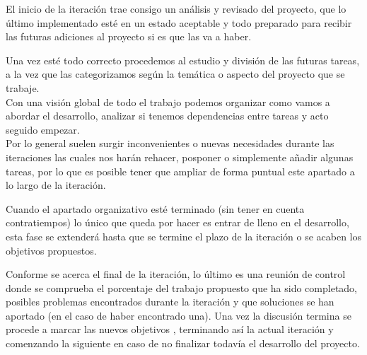El inicio de la iteración trae consigo un análisis y revisado del proyecto, que lo último
implementado esté en un estado aceptable y todo preparado para recibir las futuras adiciones
al proyecto si es que las va a haber.

Una vez esté todo correcto procedemos al estudio y división de las futuras tareas, a la vez 
que las categorizamos según la temática o aspecto del proyecto que se trabaje. \\
Con una visión global de todo el trabajo podemos organizar como vamos a
abordar el desarrollo, analizar si tenemos dependencias entre tareas y acto seguido empezar. \\
Por lo general suelen surgir inconvenientes o nuevas necesidades durante las iteraciones las
cuales nos harán rehacer, posponer o simplemente añadir algunas tareas, por lo que es posible
tener que ampliar de forma puntual este apartado a lo largo de la iteración.

Cuando el apartado organizativo esté terminado (sin tener en cuenta contratiempos) lo único 
que queda por hacer es entrar de lleno en el desarrollo, esta fase se extenderá hasta que
se termine el plazo de la iteración o se acaben los objetivos propuestos. 

Conforme se acerca el final de la iteración, lo último es una reunión de control donde 
se comprueba el porcentaje del trabajo propuesto que ha sido completado, posibles problemas 
encontrados durante la iteración y que soluciones se han aportado (en el caso de haber 
encontrado una). Una vez la discusión termina se procede a marcar las nuevos objetivos
, terminando así la actual iteración y comenzando la siguiente en caso de no finalizar 
todavía el desarrollo del proyecto.







